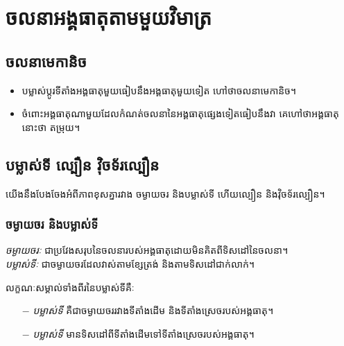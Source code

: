 \chapter{ចលនាអង្គធាតុតាមមួយវិមាត្រ}
\section{ចលនាមេកានិច}
\begin{definition}
	\begin{itemize}
		\item បម្លាស់ប្តូរទីតាំងអង្គធាតុមួយធៀបនឹងអង្គធាតុមួយទៀត ហៅថាចលនាមេកានិច។
		\item ចំពោះអង្គធាតុណាមួយដែលកំណត់ចលនានៃអង្គធាតុផ្សេងទៀតធៀបនឹងវា គេហៅថាអង្គធាតុនោះថា តម្រុយ។
	\end{itemize}
\end{definition}
\section{បម្លាស់ទី ល្បឿន វុិចទ័រល្បឿន}
\quad យើងនឹងបែងចែងអំពីភាពខុសគ្នារវាង ចម្ងាយចរ និងបម្លាស់ទី ហើយល្បឿន និងវ៉ិចទ័រល្បឿន។
\subsection{ចម្ងាយចរ និងបម្លាស់ទី}
\begin{definition}
	\emph{\kml ចម្ងាយចរៈ} ជាប្រវែងសរុបនៃចលនារបស់អង្គធាតុដោយមិនគិតពីទិសដៅនៃចលនា។\\
	\emph{\kml បម្លាស់ទីៈ} ជាចម្ងាយចរដែលវាស់តាមខ្សែត្រង់ និងតាមទិសដៅជាក់លាក់។
\end{definition}
\begin{remark}
	លក្ខណៈសម្គាល់ទាំងពីរនៃបម្លាស់ទីគឺៈ
	\begin{itemize}
		\item [$-$] \emph{\kml បម្លាស់ទី} គឺជាចម្ងាយចររវាងទីតាំងដើម និងទីតាំងស្រេចរបស់អង្គធាតុ។
		\item [$-$] \emph{\kml បម្លាស់ទី} មានទិសដៅពីទីតាំងដើម​ទៅទីតាំងស្រេចរបស់អង្គធាតុ។
	\end{itemize}
\end{remark}
